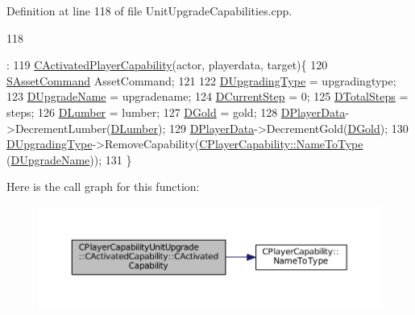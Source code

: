 Definition at line 118 of file Unit\+Upgrade\+Capabilities.\+cpp.


\begin{DoxyCode}
118                                                                                                            
                                                                                                                  
                                                                                        :
119 \hyperlink{classCActivatedPlayerCapability_a1ece00ffb6a7b925c84dd94a7407a0d1}{CActivatedPlayerCapability}(actor, playerdata, target)\{
120     \hyperlink{structSAssetCommand}{SAssetCommand} AssetCommand;
121     
122     \hyperlink{classCPlayerCapabilityUnitUpgrade_1_1CActivatedCapability_a028e222f2adc8a1035090487c93b358b}{DUpgradingType} = upgradingtype;
123     \hyperlink{classCPlayerCapabilityUnitUpgrade_1_1CActivatedCapability_acb0261591d692393b3c864d75edc799f}{DUpgradeName} = upgradename;
124     \hyperlink{classCPlayerCapabilityUnitUpgrade_1_1CActivatedCapability_a3ffaf9372ee622c3ef439396dfd00db6}{DCurrentStep} = 0;
125     \hyperlink{classCPlayerCapabilityUnitUpgrade_1_1CActivatedCapability_a56d9f9fd76c8757955e84ae8f56d5337}{DTotalSteps} = steps;
126     \hyperlink{classCPlayerCapabilityUnitUpgrade_1_1CActivatedCapability_aa4de5f57ea9d8dd85d7e6f62015c4a8d}{DLumber} = lumber;
127     \hyperlink{classCPlayerCapabilityUnitUpgrade_1_1CActivatedCapability_a259a99f41ef918edf79f6827dec06559}{DGold} = gold;
128     \hyperlink{classCActivatedPlayerCapability_a9bf27c322a73f4b11c8183cc1973c3d8}{DPlayerData}->DecrementLumber(\hyperlink{classCPlayerCapabilityUnitUpgrade_1_1CActivatedCapability_aa4de5f57ea9d8dd85d7e6f62015c4a8d}{DLumber});
129     \hyperlink{classCActivatedPlayerCapability_a9bf27c322a73f4b11c8183cc1973c3d8}{DPlayerData}->DecrementGold(\hyperlink{classCPlayerCapabilityUnitUpgrade_1_1CActivatedCapability_a259a99f41ef918edf79f6827dec06559}{DGold});
130     \hyperlink{classCPlayerCapabilityUnitUpgrade_1_1CActivatedCapability_a028e222f2adc8a1035090487c93b358b}{DUpgradingType}->RemoveCapability(\hyperlink{classCPlayerCapability_a920a696526e8a839f728192aea0ba1c5}{CPlayerCapability::NameToType}
      (\hyperlink{classCPlayerCapabilityUnitUpgrade_1_1CActivatedCapability_acb0261591d692393b3c864d75edc799f}{DUpgradeName}));
131 \}
\end{DoxyCode}
Here is the call graph for this function\+:\nopagebreak
\begin{figure}[H]
\begin{center}
\leavevmode
\includegraphics[width=350pt]{classCPlayerCapabilityUnitUpgrade_1_1CActivatedCapability_a567ef5f24fbf77a0be2d7340cd980c4a_cgraph}
\end{center}
\end{figure}
